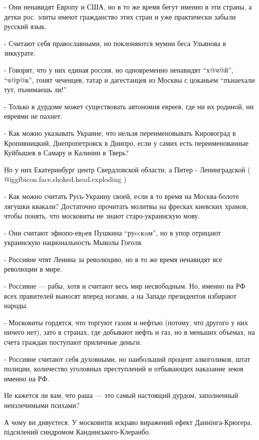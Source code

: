 - Они ненавидят Европу и США, но в то же время бегут именно в эти страны, а
детки рос. элиты имеют гражданство этих стран и уже практически забыли русский
язык. 

- Считают себя православными, но поклоняются мумии беса Ульянова в зиккурате.

- Говорят, что у них единая россия, но одновременно ненавидят \enquote{х@ч@й}, \enquote{ч@р@к},
гонят чеченцев, татар и дагестанцев из Москвы с цоканьем \enquote{пънаехали тут,
пънимаешь ли!}

- Только в дурдоме может существовать автономия евреев, где ни их родиной, ни
евреями не пахнет.

- Как можно указывать Украине, что нельзя переименовывать Кировоград в
Кропивницкий, Днепропетровск в Днипро, если у самих есть переименованные
Куйбышев в Самару и Калинин в Тверь?

Но у них Екатеринбург центр Свердловской области, а Питер - Ленинградской ( @igg{fbicon.face.shoked.head.exploding} )

- Как можно считать Русь-Украину своей, если в то время на Москва-болоте
лягушки квакали? Достаточно прочитать молитвы на фресках киевских храмов, чтобы
понять, что московиты не знают старо-украинскую мову.

- Они считают эфиопо-евpея Пушкина \enquote{руccкuм}, но в упор отрицают украинскую
национальность Мыколы Гоголя.

- Россияне чтят Ленина за революцию, но в то же время ненавидят все революции в
мире.

- Россияне — рабы, хотя и считают весь мир несвободным. Но, именно на РФ всех
правителей выносят вперед ногами, а на Западе президентов избирают народы.

- Московиты гордятся, что торгуют газом и нефтью (потому, что другого у них
ничего нет), зато в странах, где добывают нефть и газ, но в меньших объемах, на
счета граждан поступают приличные деньги.

- Россияне считают себя духовными, но наибольший процент алкоголиков, штат
полиции, количество уголовных преступлений и отбывающих наказание зеков именно
на РФ.

Не кажется ли вам, что раша — это самый настоящий дурдом, заполненный
неизлечимыми психами?

\begin{itemize} %
А чому ви дивуєтеся. У московитів яскраво виражений ефект Даннінга-Крюгера, підсилений синдромом Кандинського-Клеранбо.
\end{itemize} %
